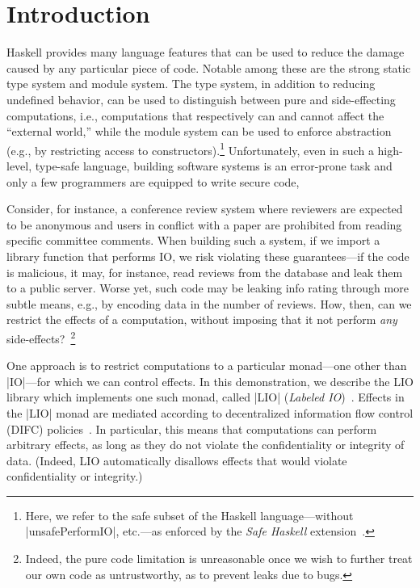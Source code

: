 \section{Introduction}
\label{sec:intro}

Haskell provides many language features that can be used to reduce the
damage caused by any particular piece of code.
%
Notable among these are the strong static type system and module
system.
%
The type system, in addition to reducing undefined behavior, can be
used to distinguish between pure and side-effecting computations,
i.e., computations that respectively can and cannot affect the
``external world,'' while the module system can be used to enforce
abstraction (e.g., by restricting access to constructors).\footnote{
  Here, we refer to the safe subset of the Haskell language---without
  \hs|unsafePerformIO|, etc.---as enforced by
  the \emph{Safe Haskell} extension~\cite{safehaskell}.
}
%
Unfortunately, even in such a high-level, type-safe language, building
software systems is an error-prone task and only a few programmers are
equipped to write secure code,
 
Consider, for instance, a conference review system where reviewers are
expected to be anonymous and users in conflict with a paper are
prohibited from reading specific committee comments.
%
When building such a system, if we import a library function that
performs IO, we risk violating these guarantees---if the code is
malicious, it may, for instance, read reviews from the database and
leak them to a public server.
%
Worse yet, such code may be leaking info rating through more subtle
means, e.g., by encoding data in the number of reviews.
%
How, then, can we restrict the effects of a computation, without
imposing that it not perform \emph{any} side-effects?~\footnote{
  Indeed, the pure code limitation is unreasonable once we wish to
  further treat our own code as untrustworthy, as to prevent leaks due
  to bugs.
}

One approach is to restrict computations to a particular monad---one
other than \hs|IO|---for which we can control effects.
%
In this demonstration, we describe the LIO library which implements
one such monad, called \hs|LIO| (\emph{Labeled IO})~\cite{lio,
concurrent-lio}.
%
Effects in the \hs|LIO| monad are mediated according to
decentralized information flow control (DIFC)
policies~\cite{myers:dlm, sabelfeld:language-based-iflow}.
%
In particular, this means that computations can perform arbitrary
effects, as long as they do not violate the confidentiality or
integrity of data.
%
(Indeed, LIO automatically disallows effects that would violate
confidentiality or integrity.)
